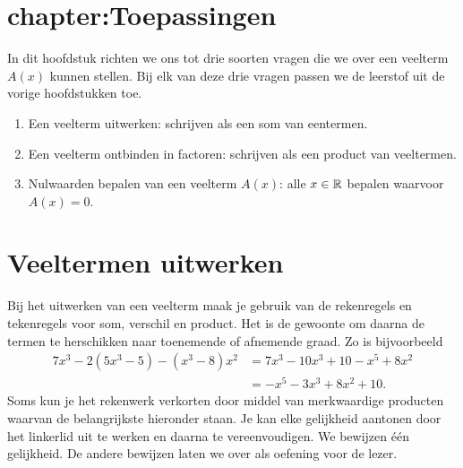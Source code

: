 \documentclass{ximera}
\begin{document}
	\author{Koen de Naeghel - Wiskunde Op Maat}



	\section{chapter:Toepassingen}

	In dit hoofdstuk richten we ons tot drie soorten vragen die we over een veelterm $A(x)$ kunnen stellen. Bij elk van deze drie vragen passen we de leerstof uit de vorige hoofdstukken toe. 
	\begin{enumerate}[(1)]
	\item
	Een veelterm uitwerken: schrijven als een som van eentermen. 
	\item
	Een veelterm ontbinden in factoren: schrijven als een product van veeltermen.
	\item
	Nulwaarden bepalen van een veelterm $A(x)$: alle $x \in \mathbb{R}$ bepalen waarvoor $A(x) = 0$. 
	\end{enumerate}
	
	
	
	
	
	
	
	
	
	
	
	
	
	
	\section{Veeltermen uitwerken}
	
	Bij het uitwerken van een veelterm maak je gebruik van de rekenregels en tekenregels voor som, verschil en product. Het is de gewoonte om daarna de termen te herschikken naar toenemende of afnemende graad. Zo is bijvoorbeeld
	\begin{align*}
	7x^3-2(5x^3-5)-(x^3-8)x^2 & = 7x^3 - 10x^3 + 10 - x^5 + 8x^2 \\
	& = -x^5 - 3x^3 + 8x^2 + 10.
	\end{align*}
	Soms kun je het rekenwerk verkorten door middel van merkwaardige producten
	waarvan de belangrijkste hieronder staan. Je kan elke gelijkheid aantonen door het linkerlid uit te werken en daarna te vereenvoudigen. We bewijzen \'e\'en gelijkheid. De andere bewijzen laten we over als oefening voor de lezer. 
	
\end{document}
